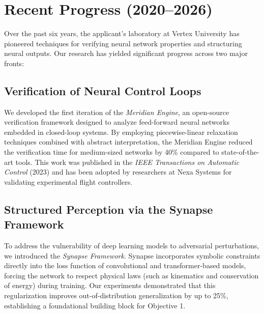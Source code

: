 \documentclass[12pt, letterpaper]{article}
\begin{document}
\section{Recent Progress (2020--2026)}
Over the past six years, the applicant's laboratory at Vertex University has pioneered techniques for verifying neural network properties and structuring neural outputs. Our research has yielded significant progress across two major fronts:

\subsection{Verification of Neural Control Loops}
We developed the first iteration of the \emph{Meridian Engine}, an open-source verification framework designed to analyze feed-forward neural networks embedded in closed-loop systems. By employing piecewise-linear relaxation techniques combined with abstract interpretation, the Meridian Engine reduced the verification time for medium-sized networks by 40\% compared to state-of-the-art tools. This work was published in the \emph{IEEE Transactions on Automatic Control} (2023) and has been adopted by researchers at Nexa Systems for validating experimental flight controllers.

\subsection{Structured Perception via the Synapse Framework}
To address the vulnerability of deep learning models to adversarial perturbations, we introduced the \emph{Synapse Framework}. Synapse incorporates symbolic constraints directly into the loss function of convolutional and transformer-based models, forcing the network to respect physical laws (such as kinematics and conservation of energy) during training. Our experiments demonstrated that this regularization improves out-of-distribution generalization by up to 25\%, establishing a foundational building block for Objective 1.
\end{document}
